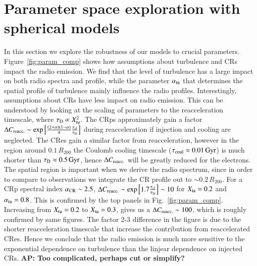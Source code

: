 \documentclass[a4paper,fleqn,usenatbib]{mnras}
\def\AP#1{{\bf  AP: #1}}
\begin{document}
\section{Parameter space exploration with spherical models}
\label{sect:param_comp}
In this section we explore the robustness of our models to crucial
parameters. Figure~\ref{fig:param_comp} shows how assumptions about
turbulence and CRs impact the radio emission. We find that the level
of turbulence has a large impact on both radio spectra and profile,
while the parameter $\alpha_{\mathrm{tu}}$ that determines the spatial
profile of turbulence mainly influence the radio
profiles. Interestingly, assumptions about CRs have less impact on
radio emission. This can be understood by looking at the scaling of
parameters to the reacceleration timescale, where $\tau_{\mathrm{D}}
\propto X_{\mathrm{tu}}^2$. The CRps approximately gain a factor $\Delta
C_{\mathrm{reacc.}} \sim
\exp{\left[\frac{(2+\alpha)(1-\alpha)}{4}\frac{\tau_{\mathrm{cl}}}{\tau_{\mathrm{D}}}\right]}$
during reacceleration if injection and cooling are neglected. The CRes
gain a similar factor from reacceleration, however in the region
around $0.1\,R_{200}$ the Coulomb cooling timescale
($\tau_{\mathrm{coul}}\approx0.01\,{\mathrm{Gyr}}$) is much shorter than
$\tau_{\mathrm{D}}\approx0.5\,{\mathrm{Gyr}}$, hence $\Delta C_{\mathrm{reacc.}}$
will be greatly reduced for the electrons. The spatial region is
important when we derive the radio spectrum, since in order to compare
to observations we integrate the CR profile out to $\sim
0.2\,R_{200}$. For a CRp spectral index $\alpha_{\mathrm{CR}}\sim 2.5$,
$\Delta C_{\mathrm{reacc.}} \sim
\exp{\left[1.7\frac{\tau_{\mathrm{cl}}}{\tau_{\mathrm{D}}}\right]} \sim 10$ for
$X_{\mathrm{tu}}=0.2$ and $\alpha_{\mathrm{tu}}=0.8$. This is confirmed by the
top panels in Fig.~\ref{fig:param_comp}. Increasing from
$X_{\mathrm{tu}}=0.2$ to $X_{\mathrm{tu}}=0.3$, gives us a $\Delta
C_{\mathrm{reacc.}}  \sim 100$, which is roughly confirmed by same
figures. The factor 2-3 difference in the figure is due to the shorter
reacceleration timescale that increase the contribution from
reaccelerated CRes. Hence we conclude that the radio emission is much
more sensitive to the exponential dependence on turbulence than the
linjear dependence on injected CRs. \AP{Too complicated, perhaps cut
  or simplify?}
\end{document}
